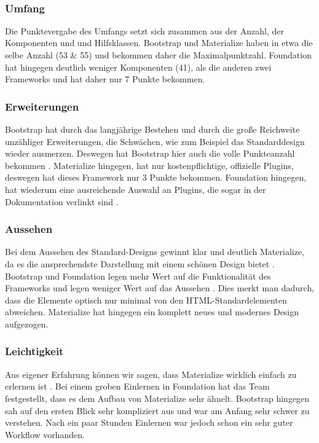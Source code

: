 \label{tbl:comparison}~\\
\subsubsection{Umfang}
Die Punktevergabe des Umfangs setzt sich zusammen aus der Anzahl, der Komponenten und und Hilfsklassen. Bootstrap und Materialize haben in etwa die selbe Anzahl (53 \& 55) und bekommen daher die Maximalpunktzahl\cite{bootstrap-docu,WebDocMaterialize,foundation-docu}. Foundation hat hingegen deutlich weniger Komponenten (41), als die anderen zwei Frameworks und hat daher nur 7 Punkte bekommen.
\subsubsection{Erweiterungen}
Bootstrap hat durch das langjährige Bestehen und durch die große Reichweite unzähliger Erweiterungen, die Schwächen, wie zum Beispiel das Standarddesign wieder ausmerzen. Deswegen hat Bootstrap hier auch die volle Punkteanzahl bekommen \cite{introduction-bootstrap}. Materialize hingegen, hat nur kostenpflichtige, offizielle Plugins, deswegen hat dieses Framework nur 3 Punkte bekommen. Foundation hingegen, hat wiederum eine ausreichende Auswahl an Plugins, die sogar in der Dokumentation verlinkt sind \cite{foundation-docu}. 
\subsubsection{Aussehen}
Bei dem Aussehen des Standard-Designs gewinnt klar und deutlich Materialize, da es die ansprechendste Darstellung mit einem schönen Design bietet \cite{WebDocMaterialize}. Bootstrap und Foundation legen mehr Wert auf die Funktionalität des Frameworks und legen weniger Wert auf das Aussehen \cite{bootstrap-docu, foundation-docu}. Dies merkt man dadurch, dass die Elemente optisch nur minimal von den HTML-Standardelementen abweichen. Materialize hat hingegen ein komplett neues und modernes Design aufgezogen.
\subsubsection{Leichtigkeit}
Aus eigener Erfahrung können wir sagen, dass Materialize wirklich einfach zu erlernen ist \cite{WebDocMaterialize}. Bei einem groben Einlernen in Foundation hat das Team festgestellt, dass es dem Aufbau von Materialize sehr ähnelt. Bootstrap hingegen sah auf den ersten Blick sehr kompliziert aus und war am Anfang sehr schwer zu verstehen. Nach ein paar Stunden Einlernen war jedoch schon ein sehr guter Workflow vorhanden.
